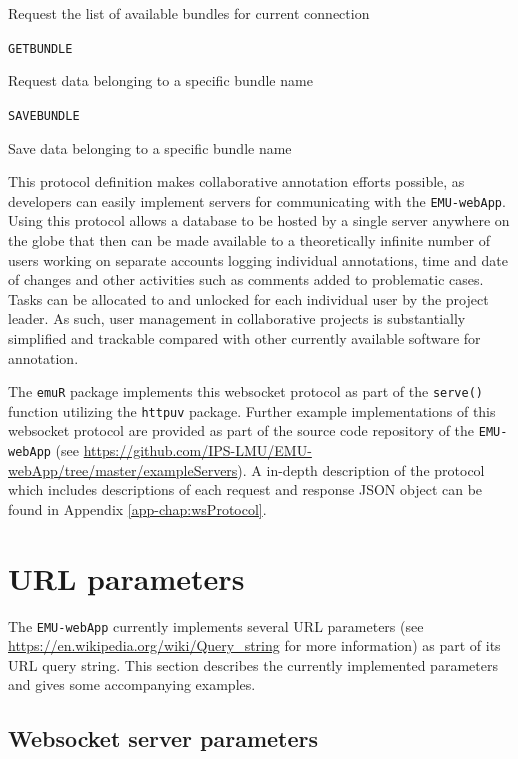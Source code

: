 \documentclass[]{book}
\begin{document}
Request the list of available bundles for current connection

\texttt{GETBUNDLE}

Request data belonging to a specific bundle name

\texttt{SAVEBUNDLE}

Save data belonging to a specific bundle name

This protocol definition makes collaborative annotation efforts possible, as developers can easily implement servers for communicating with the \texttt{EMU-webApp}. Using this protocol allows a database to be hosted by a single server anywhere on the globe that then can be made available to a theoretically infinite number of users working on separate accounts logging individual annotations, time and date of changes and other activities such as comments added to problematic cases. Tasks can be allocated to and unlocked for each individual user by the project leader. As such, user management in collaborative projects is substantially simplified and trackable compared with other currently available software for annotation.

The \texttt{emuR} package implements this websocket protocol as part of the \texttt{serve()} function utilizing the \texttt{httpuv} package. Further example implementations of this websocket protocol are provided as part of the source code repository of the \texttt{EMU-webApp} (see \url{https://github.com/IPS-LMU/EMU-webApp/tree/master/exampleServers}). A in-depth description of the protocol which includes descriptions of each request and response JSON object can be found in Appendix \ref{app-chap:wsProtocol}.

\hypertarget{url-parameters}{%
\section{URL parameters}\label{url-parameters}}

The \texttt{EMU-webApp} currently implements several URL parameters (see \url{https://en.wikipedia.org/wiki/Query_string} for more information) as part of its URL query string. This section describes the currently implemented parameters and gives some accompanying examples.

\hypertarget{websocket-server-parameters}{%
\subsection{Websocket server parameters}\label{websocket-server-parameters}}
\end{document}
